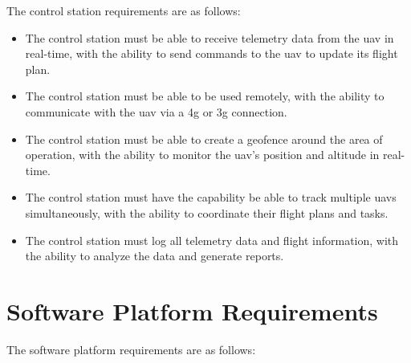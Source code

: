 The control station requirements are as follows:


\begin{itemize}
  \item The control station must be able to receive telemetry data from the \gls{uav} in real-time, with the ability to send commands to the \gls{uav} to update its flight plan.

  \item The control station must be able to be used remotely, with the ability to communicate with the \gls{uav} via a \gls{4g} or \gls{3g} connection.

  \item The control station must be able to create a geofence around the area of operation, with the ability to monitor the \gls{uav}'s position and altitude in real-time.

  \item The control station must have the capability be able to track multiple \glspl{uav} simultaneously, with the ability to coordinate their flight plans and tasks.

  \item The control station must log all telemetry data and flight information, with the ability to analyze the data and generate reports.
\end{itemize}

\section{Software Platform Requirements}

The software platform requirements are as follows:

